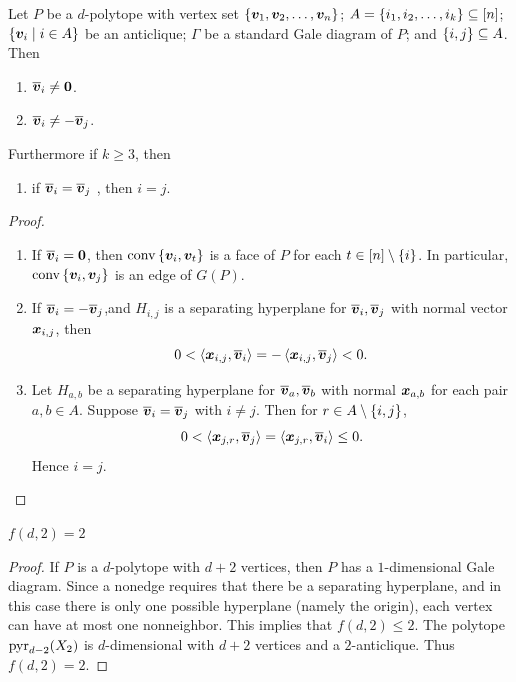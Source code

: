 \begin{Theorem}\label{Thm:TrivialitiesAnticliques}
    Let \(P\) be a \(d\)-polytope with vertex set \(\left\{\bm{v}_1,\bm{v}_2,\dotsc,\bm{v}_{n}\right\}\);  \(A=\left\{i_1,i_2,\dotsc, i_k\right\}\subseteq\left[n\right]\); \(\setb{\ve v_{i}}{i\in A}\) be an anticlique;  \(\Gamma\) be a standard Gale diagram of \(P\); and \(\left\{i,j\right\}\subseteq A\).  Then
        \begin{enumerate}
            \item   \(\overline{\bm{v}}_i\ne\bm{0}\).
            \item   \(\overline{\bm{v}}_i\ne-\overline{\bm{v}}_j\).
        \end{enumerate}
    Furthermore if \(k\ge3\), then
        \begin{enumerate}[resume]
            \item\label{ThmPt:notequal}   if \(\overline{\bm{v}}_i=\overline{\bm{v}}_j\) , then \(i=j\).
        \end{enumerate}
\end{Theorem}
\begin{proof}\ph
    \begin{enumerate}
        \item   If \(\overline{\bm{v}}_i=\bm{0}\), then \(\operatorname{conv}\left\{\bm{v}_i,\bm{v}_t\right\}\) is a face of \(P\) for each \(t\in\left[n\right]\setminus\{i\}\).  In particular, \(\operatorname{conv}\left\{\bm{v}_i,\bm{v}_j\right\}\) is an edge of \(G(P)\).
        \item  If \(\overline{\bm{v}}_i=-\overline{\bm{v}}_j\),and \(H_{i,j}\) is a separating hyperplane for \(\overline{\bm{v}}_i,\overline{\bm{v}}_j\) with normal vector \(\bm{x}_{i,j}\), then
                \[
                    0<\left\langle\bm{x}_{i,j},\overline{\bm{v}}_i\right\rangle=-\left\langle\bm{x}_{i,j},\overline{\bm{v}}_j\right\rangle<0.
                \]
        \item  Let \(H_{a,b}\) be a separating hyperplane for \(\overline{\bm{v}}_a,\overline{\bm{v}}_b\) with normal \(\bm{x}_{a,b}\) for each pair \(a,b\in A\).  Suppose \(\overline{\bm{v}}_i=\overline{\bm{v}}_j\) with \(i\ne j\).  Then for \(r\in A\setminus\left\{i,j\right\}\),
                \[
                    0   <\left\langle\bm{x}_{j,r},\overline{\bm{v}}_j\right\rangle
                        =\left\langle\bm{x}_{j,r},\overline{\bm{v}}_i\right\rangle
                        \le 0.
                \]
            Hence \(i=j\).\qedhere
    \end{enumerate}
\end{proof}
\begin{Theorem}
    \(f(d,2)=2\)
\end{Theorem}
\begin{proof}
    If \(P\) is a \(d\)-polytope with \(d+2\) vertices, then \(P\) has a \(1\)-dimensional Gale diagram.  Since a nonedge requires that there be a separating hyperplane, and in this case there is only one possible hyperplane (namely the origin), each vertex can have at most one nonneighbor.  This implies that \(f(d,2)\le2\).  The polytope \(\operatorname{pyr}_{d-2}(X_{2})\) is \(d\)-dimensional with \(d+2\) vertices and a \(2\)-anticlique.  Thus \(f(d,2)=2\).
\end{proof}
